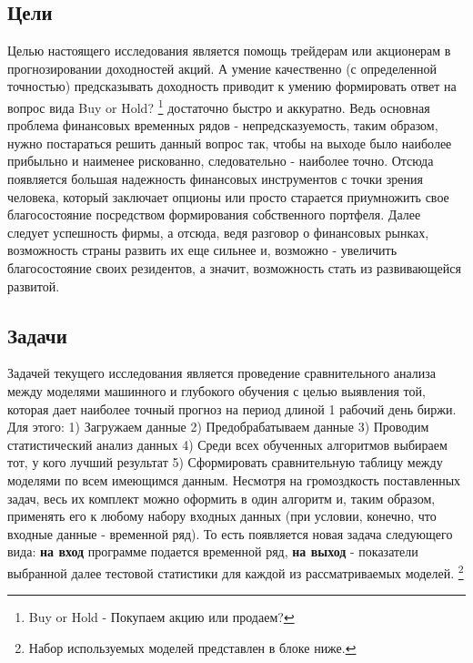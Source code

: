 	\subsection{Цели}
		Целью настоящего исследования является помощь трейдерам или акционерам в прогнозировании доходностей акций. А умение качественно (с определенной точностью) предсказывать доходность приводит к умению формировать ответ на вопрос вида Buy or Hold? \footnote{Buy or Hold - Покупаем акцию или продаем?} достаточно быстро и аккуратно. Ведь основная проблема финансовых временных рядов - непредсказуемость, таким образом, нужно постараться решить данный вопрос так, чтобы на выходе было наиболее прибыльно и наименее рискованно, следовательно - наиболее точно. Отсюда появляется большая надежность финансовых инструментов с точки зрения человека, который заключает опционы или просто старается приумножить свое благосостояние посредством формирования собственного портфеля. Далее следует успешность фирмы, а отсюда, ведя разговор о финансовых рынках, возможность страны развить их еще сильнее и, возможно - увеличить благосостояние своих резидентов, а значит, возможность стать из развивающейся развитой. 
	\subsection{Задачи}
		Задачей текущего исследования является проведение сравнительного анализа между моделями машинного и глубокого обучения с целью выявления той, которая дает наиболее точный прогноз на период длиной 1 рабочий день биржи. Для этого: 1) Загружаем данные 2) Предобрабатываем данные 3) Проводим статистический анализ данных 4) Среди всех обученных алгоритмов выбираем тот, у кого лучший результат 5) Сформировать сравнительную таблицу между моделями по всем имеющимся данным. Несмотря на громоздкость поставленных задач, весь их комплект можно оформить в один алгоритм и, таким образом, применять его к любому набору входных данных (при условии, конечно, что входные данные - временной ряд). То есть появляется новая задача следующего вида: \textbf{на вход} программе подается временной ряд, \textbf{на выход} - показатели выбранной далее  тестовой статистики для каждой из рассматриваемых моделей. \footnote{Набор используемых моделей представлен в блоке ниже.}                  